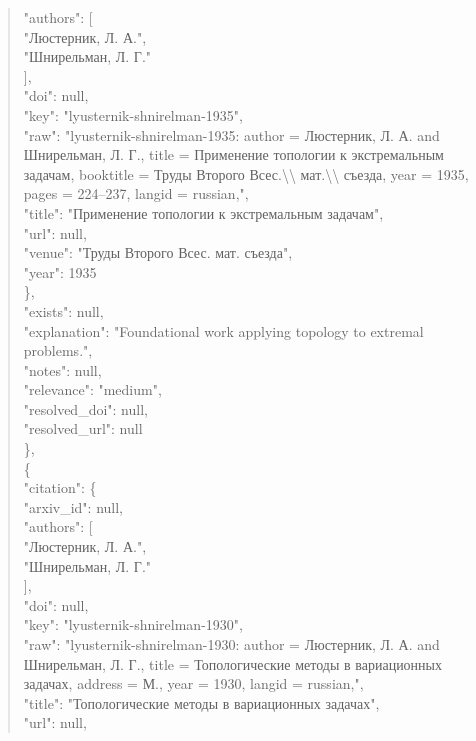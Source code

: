 \documentclass[11pt]{article}
\begin{document}
\begin{quote}
        "authors": [\\
          "Люстерник, Л. А.",\\
          "Шнирельман, Л. Г."\\
        ],\\
        "doi": null,\\
        "key": "lyusternik-shnirelman-1935",\\
        "raw": "lyusternik-shnirelman-1935: author = Люстерник, Л. А. and Шнирельман, Л. Г., title = Применение топологии к экстремальным задачам, booktitle = Труды Второго Всес.\textbackslash{}\textbackslash{} мат.\textbackslash{}\textbackslash{} съезда, year = 1935, pages = 224--237, langid = russian,",\\
        "title": "Применение топологии к экстремальным задачам",\\
        "url": null,\\
        "venue": "Труды Второго Всес. мат. съезда",\\
        "year": 1935\\
      \},\\
      "exists": null,\\
      "explanation": "Foundational work applying topology to extremal problems.",\\
      "notes": null,\\
      "relevance": "medium",\\
      "resolved\_doi": null,\\
      "resolved\_url": null\\
    \},\\
    \{\\
      "citation": \{\\
        "arxiv\_id": null,\\
        "authors": [\\
          "Люстерник, Л. А.",\\
          "Шнирельман, Л. Г."\\
        ],\\
        "doi": null,\\
        "key": "lyusternik-shnirelman-1930",\\
        "raw": "lyusternik-shnirelman-1930: author = Люстерник, Л. А. and Шнирельман, Л. Г., title = Топологические методы в вариационных задачах, address = М., year = 1930, langid = russian,",\\
        "title": "Топологические методы в вариационных задачах",\\
        "url": null,\\

\end{quote}
\end{document}
